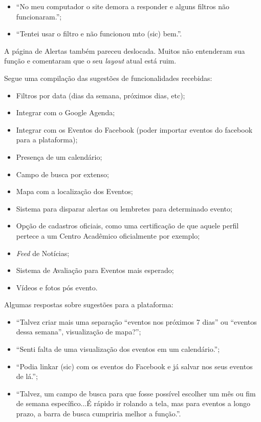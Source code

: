 \begin{itemize}
\item ``No meu computador o site demora a responder e alguns filtros não funcionaram.'';
\item ``Tentei usar o filtro e não funcionou mto (sic) bem.''.
\end{itemize}
\par A página de Alertas também pareceu deslocada. Muitos não entenderam sua função e comentaram que o seu \emph{layout} atual está ruim.
\par Segue uma compilação das sugestões de funcionalidades recebidas:
\begin{itemize}
\item Filtros por data (dias da semana, próximos dias, etc);
\item Integrar com o Google Agenda;
\item Integrar com os Eventos do Facebook (poder importar eventos do facebook para a plataforma);
\item Presença de um calendário;
\item Campo de busca por extenso;
\item Mapa com a localização dos Eventos;
\item Sistema para disparar alertas ou lembretes para determinado evento;
\item Opção de cadastros oficiais, como uma certificação de que aquele perfil pertece a um Centro Acadêmico oficialmente por exemplo;
\item \emph{Feed} de Notícias;
\item Sistema de Avaliação para Eventos mais esperado;
\item Vídeos e fotos pós evento.
\end{itemize}

\par Algumas respostas sobre sugestões para a plataforma:
\begin{itemize}

\item ``Talvez criar mais uma separação ``eventos nos próximos 7 dias'' ou ``eventos dessa semana'', visualização de mapa?'';
\item ``Senti falta de uma visualização dos eventos em um calendário.'';
\item ``Podia linkar (sic) com os eventos do Facebook e já salvar nos seus eventos de lá.'';
\item ``Talvez, um campo de busca para que fosse possível escolher um mês ou fim de semana específico...É rápido ir rolando a tela, mas para eventos a longo prazo, a barra de busca cumpriria melhor a função.''.
\end{itemize}


